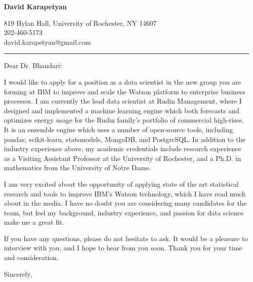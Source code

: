 \documentclass[12pt]{letter}
\date{\vspace{0.5cm}\flushleft}
\begin{document}
\begin{letter}{}
\begin{center}
{\bf {\Large David Karapetyan}}
\end{center}

\begin{center}
{819 Hylan Hall, University of Rochester, NY 14607  \\ 
202-460-5173 \\  david.karapetyan@gmail.com
}
\end{center}
\hrule

\opening{Dear Dr. Bhandari:\\}
%
%
I would like to apply for a position as a data scientist in the new group
you are forming at IBM to improve and scale the Watson platform to enterprise business processes. I am currently the lead data scientist at
Rudin Management, where I designed and implemented a machine learning
engine which both forecasts and optimizes energy usage for the Rudin family's
portfolio of commercial high-rises. It is an ensemble engine which uses a number
of open-source tools, including pandas, scikit-learn,
statsmodels, MongoDB, and PostgreSQL.
In addition to the industry experience above,
my academic credentials include research experience as a Visiting Assistant Professor at the University of Rochester,
and a Ph.D. in mathematics from the University of Notre Dame.

I am very excited about the opportunity of applying state of the art statistical
research and tools to improve IBM's Watson technology, which I have read much
about in the media.  I have no doubt you are considering many candidates for the
team, but feel my background, industry experience, and passion for data
science make me a great fit.

If you have any questions, please do not hesitate to ask. It would be a pleasure to interview with you, and I hope to hear from you soon. Thank you for your time and consideration.


\closing{Sincerely,}


\end{letter}
\end{document}
